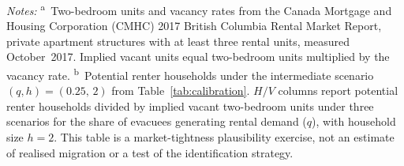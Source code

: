 \documentclass[12pt]{article}
\begin{document}
\begin{table}[htbp]
  \caption{Potential Rental Demand Relative to Vacant Two-Bedroom Apartments in 2017}
  \label{tab:vacancy_calibration}
  \centering\small
  \begin{threeparttable}
    \begin{tablenotes}[flushleft]\footnotesize
      \item \textit{Notes:}
        \textsuperscript{a}~Two-bedroom units and vacancy rates from the
        Canada Mortgage and Housing Corporation (CMHC) 2017 British Columbia
        Rental Market Report, private apartment structures with at least three
        rental units, measured October~2017.
        Implied vacant units equal two-bedroom units multiplied by the
        vacancy rate.
        \textsuperscript{b}~Potential renter households under the
        intermediate scenario $(q,h)=(0.25,\,2)$ from
        Table~\ref{tab:calibration}.
        $H/V$ columns report potential renter households divided by implied
        vacant two-bedroom units under three scenarios for the share of
        evacuees generating rental demand ($q$), with household size $h=2$.
        This table is a market-tightness plausibility exercise, not an
        estimate of realised migration or a test of the identification
        strategy.
    \end{tablenotes}
  \end{threeparttable}
\end{table}
\end{document}

